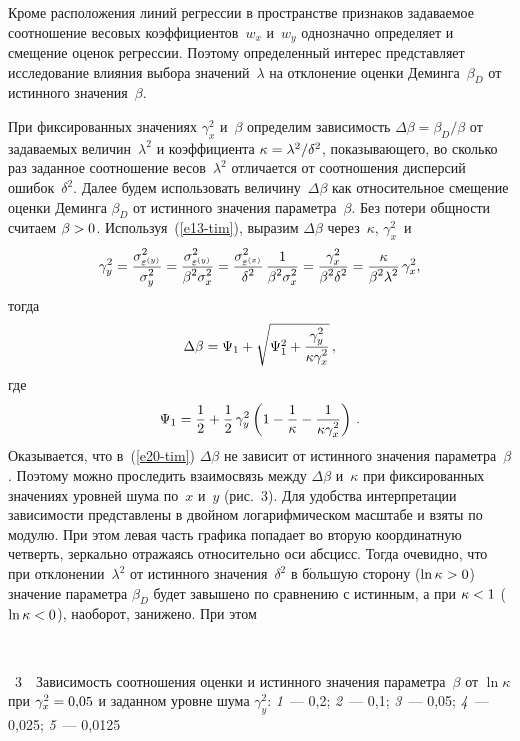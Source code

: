 \begin{multicols}{2}
  Кроме расположения линий регрессии в пространстве признаков
задаваемое соотношение весовых коэффициентов~$w_x$ и~$w_y$
однозначно определяет и смещение оценок регрессии. Поэтому
определенный интерес представляет исследование влияния выбора
значений~$\lambda$ на отклонение оценки Деминга~$\beta_D$ от истинного
значения~$\beta$.

  При фиксированных значениях $\gamma_x^2$ и~$\beta$ определим
зависимость $\Delta\beta=\beta_D/\beta$ от задаваемых величин~$\lambda^2$
и коэффициента $\kappa\hm= \lambda^2/\delta^2$, показывающего, во
сколько раз заданное соотношение весов~$\lambda^2$ отличается от
соотношения дисперсий ошибок~$\delta^2$. Далее будем использовать
величину~$\Delta\beta$ как относительное смещение оценки Деминга
$\beta_D$ от истинного значения параметра~$\beta$. Без потери общности
считаем $\beta\hm>0$. Используя~(\ref{e13-tim}), выразим $\Delta\beta$
через~$\kappa$, $\gamma_x^2$~и
  $$
  \gamma_y^2= \displaystyle\frac{\displaystyle \sigma^2_{\varepsilon^{(y)}}\mathstrut}{\displaystyle \sigma^2_y\mathstrut}=
  \displaystyle\frac{\displaystyle \sigma^2_{\varepsilon^{(y)}}\mathstrut}{\displaystyle \beta^2\sigma^2_x\mathstrut}=
  \displaystyle\frac{\displaystyle \sigma^2_{\varepsilon^{(x)}}\mathstrut}{\displaystyle \delta^2\mathstrut}\,\displaystyle\frac{\displaystyle 1\mathstrut}{\displaystyle \beta^2\sigma^2_x\mathstrut} =
\displaystyle\frac{\displaystyle \gamma_x^2\mathstrut}{\displaystyle \beta^2\delta^2\mathstrut}= \displaystyle\frac{\displaystyle \kappa\mathstrut}{\displaystyle \beta^2
\lambda^2\mathstrut}\,\gamma_x^2,
  $$
тогда
\begin{equation}
\Delta\beta =\Psi_1+\sqrt{\Psi_1^2+\displaystyle\frac{\displaystyle \gamma_y^2\mathstrut}{\displaystyle \kappa \gamma^2_x\mathstrut}}\,,
\label{e20-tim}
\end{equation}
где
$$
\Psi_1=\displaystyle\frac{\displaystyle 1\mathstrut}{\displaystyle 2\mathstrut}+\displaystyle\frac{\displaystyle 1\mathstrut}{\displaystyle 2\mathstrut}\,\gamma_y^2\left( 1-\displaystyle\frac{\displaystyle 1\mathstrut}{\displaystyle \kappa\mathstrut}-\displaystyle\frac{\displaystyle 1\mathstrut}{\displaystyle \kappa
\gamma_x^2\mathstrut}\right)\,.
$$
Оказывается, что в~(\ref{e20-tim}) $\Delta\beta$ не зависит от истинного
значения параметра~$\beta$. Поэтому можно проследить взаимосвязь между
$\Delta\beta$ и~$\kappa$ при фиксированных значениях уровней шума
по~$x$ и~$y$ (рис.~3). Для удобства интерпретации зависимости
представлены в двойном логарифмическом масштабе и взяты по модулю.
При этом левая часть графика попадает во вторую координатную четверть,
зеркально отражаясь относительно оси абсцисс. Тогда очевидно, что при
отклонении~$\lambda^2$ от истинного значения~$\delta^2$ в б$\acute{\mbox{о}}$льшую
сторону ($\ln\kappa\hm>0$) значение параметра $\beta_D$ будет завышено
по сравнению с истинным, а при
 $\kappa\hm<1$ ($\ln\kappa\hm<0$),
наоборот, занижено. При этом\linebreak

\begin{center}  %
\vspace*{9pt}
 \mbox{%
 \epsfxsize=72.926mm
 }
 \end{center}
{{\figurename~3}\ \ \small{Зависимость соотношения оценки и истинного значения параметра~$\beta$ от
$\ln \kappa$ при $\gamma_x^2\hm=0{,}05$ и заданном уровне шума $\gamma_y^2$: \textit{1}~--- 
0,2; \textit{2}~--- 0,1; \textit{3}~--- 0,05; \textit{4}~--- 0,025;
\textit{5}~--- 0,0125}}


\end{multicols}
